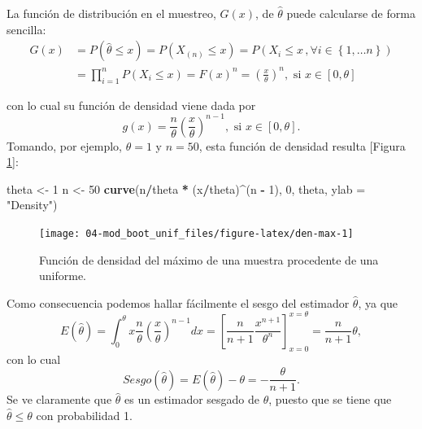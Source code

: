 \documentclass[]{book}
\newenvironment{Shaded}{\begin{snugshade}}{\end{snugshade}}
\newcommand{\KeywordTok}[1]{\textcolor[rgb]{0.13,0.29,0.53}{\textbf{#1}}}
\newcommand{\DataTypeTok}[1]{\textcolor[rgb]{0.13,0.29,0.53}{#1}}
\newcommand{\DecValTok}[1]{\textcolor[rgb]{0.00,0.00,0.81}{#1}}
\newcommand{\StringTok}[1]{\textcolor[rgb]{0.31,0.60,0.02}{#1}}
\newcommand{\OperatorTok}[1]{\textcolor[rgb]{0.81,0.36,0.00}{\textbf{#1}}}
\newcommand{\NormalTok}[1]{#1}
\theoremstyle{definition}
\theoremstyle{definition}
\theoremstyle{definition}
\theoremstyle{remark}
\begin{document}
La función de distribución en el muestreo, \(G\left( x \right)\), de
\(\hat{\theta}\) puede calcularse de forma sencilla:\[\begin{aligned}
G\left( x \right) &= P\left( \hat{\theta}\leq x \right) =P\left( X_{\left(
n \right)}\leq x \right) =P\left( X_i\leq x\,,\forall i\in \left\{ 1,\ldots
n\right\} \right) \\
&= \prod_{i=1}^{n}P\left( X_i\leq x \right) =F\left( x \right)^{n}=\left( 
\frac{x}{\theta } \right)^{n},\text{ si }x\in \left[ 0,\theta \right]\end{aligned}\]

con lo cual su función de densidad viene dada por
\[g\left( x \right) =\frac{n}{\theta }\left( \frac{x}{\theta } \right)^{n-1},
\text{ si }x\in \left[ 0,\theta \right] .\] Tomando, por ejemplo,
\(\theta =1\) y \(n=50\), esta función de densidad resulta {[}Figura
\ref{fig:den-max}{]}:

\begin{Shaded}
\begin{Highlighting}[]
\NormalTok{theta <-}\StringTok{ }\DecValTok{1}
\NormalTok{n <-}\StringTok{ }\DecValTok{50}
\KeywordTok{curve}\NormalTok{(n}\OperatorTok{/}\NormalTok{theta }\OperatorTok{*}\StringTok{ }\NormalTok{(x}\OperatorTok{/}\NormalTok{theta)}\OperatorTok{^}\NormalTok{(n }\OperatorTok{-}\StringTok{ }\DecValTok{1}\NormalTok{), }\DecValTok{0}\NormalTok{, theta, }\DataTypeTok{ylab =} \StringTok{"Density"}\NormalTok{)}
\end{Highlighting}
\end{Shaded}

\begin{figure}[!htb]

{\centering \texttt{[image: 04-mod\_boot\_unif\_files/figure-latex/den-max-1]} 

}

\caption{Función de densidad del máximo de una muestra procedente de una uniforme.}\label{fig:den-max}
\end{figure}

Como consecuencia podemos hallar fácilmente el sesgo del estimador
\(\hat{\theta}\), ya que
\[E\left( \hat{\theta} \right) =\int_{0}^{\theta }x\frac{n}{\theta }\left( 
\frac{x}{\theta } \right)^{n-1}dx=\left[ \frac{n}{n+1}\frac{x^{n+1}}{\theta
^{n}}\right] _{x=0}^{x=\theta }=\frac{n}{n+1}\theta ,\] con lo cual
\[Sesgo\left( \hat{\theta} \right) =E\left( \hat{\theta} \right)
-\theta = -\frac{\theta }{n+1}.\] Se ve claramente que \(\hat{\theta}\)
es un estimador sesgado de \(\theta\), puesto que se tiene que
\(\hat{\theta}\leq \theta\) con probabilidad 1.
\end{document}
